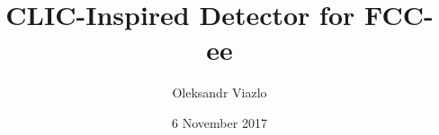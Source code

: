 \documentclass[8pt]{beamer}
\newif\ifplacelogo %
\begin{document}
\newcommand{\myNode}{\tikz[baseline,inner sep=1pt] \node[anchor=base]}



\title[ CLIC-Inspired Detector for FCC-ee \hspace{13.5em}\insertframenumber/
\inserttotalframenumber]{ CLIC-Inspired Detector for FCC-ee }


	\author[Oleksandr Viazlo]{Oleksandr Viazlo \\ 
	}
	
       
	\date{6 November 2017}


	
   	\frame{\titlepage}

   	

\placelogofalse
\end{document}
